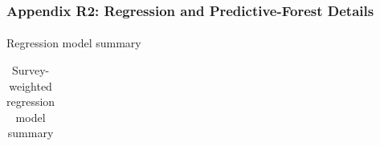 \documentclass[
  11pt,
  a4paper,
]{article}
\makeatletter
\let\oldparagraph\paragraph
\renewcommand{\paragraph}{
    \@ifstar
      \xxxParagraphStar
      \xxxParagraphNoStar
  }
\newcommand{\xxxParagraphStar}[1]{\oldparagraph*{#1}\mbox{}}
\newcommand{\xxxParagraphNoStar}[1]{\oldparagraph{#1}\mbox{}}
\makeatother
\begin{document}
\subsubsection{Appendix R2: Regression and Predictive-Forest
Details}\label{appendix-r2-regression-and-predictive-forest-details}

\paragraph{Regression model summary}\label{regression-model-summary}

\begingroup\fontsize{11}{13}\selectfont

\begin{longtable}[t]{>{\raggedleft\arraybackslash}p{4.5cm}rrrrrr}

\caption{\label{tbl-appendix-regression-model-summary}Survey-weighted
regression model summary}

\tabularnewline


\end{longtable}
\end{document}
